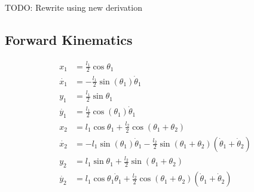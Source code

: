 {\color{red} TODO: Rewrite using new derivation}
\subsection*{Forward Kinematics}
\begin{align}
	x_1 &= \frac{l_1}{2}\cos\theta_1\nonumber \\
	\dot{x_1} &= -\frac{l_1}{2}\sin(\theta_1)\dot{\theta}_1\nonumber \\
	y_1 &= \frac{l_1}{2}\sin\theta_1\nonumber \\
	\dot{y_1} &= \frac{l_1}{2}\cos(\theta_1)\dot{\theta}_1\nonumber \\
	x_2 &= l_1\cos\theta_1 + \frac{l_2}{2}\cos(\theta_1 + \theta_2)\nonumber \\
	\dot{x_2} &= -l_1\sin(\theta_1)\dot{\theta}_1 - \frac{l_2}{2}\sin(\theta_1 + \theta_2)(\dot{\theta}_1 + \dot{\theta}_2)\label{eqn:x2dot} \\
	y_2 &= l_1\sin\theta_1 + \frac{l_2}{2}\sin(\theta_1 + \theta_2)\nonumber \\
	\dot{y_2} &= l_1\cos\theta_1\dot{\theta}_1 + \frac{l_2}{2}\cos(\theta_1 + \theta_2)(\dot{\theta}_1 + \dot{\theta}_2)\label{eqn:y2dot}
\end{align}  

